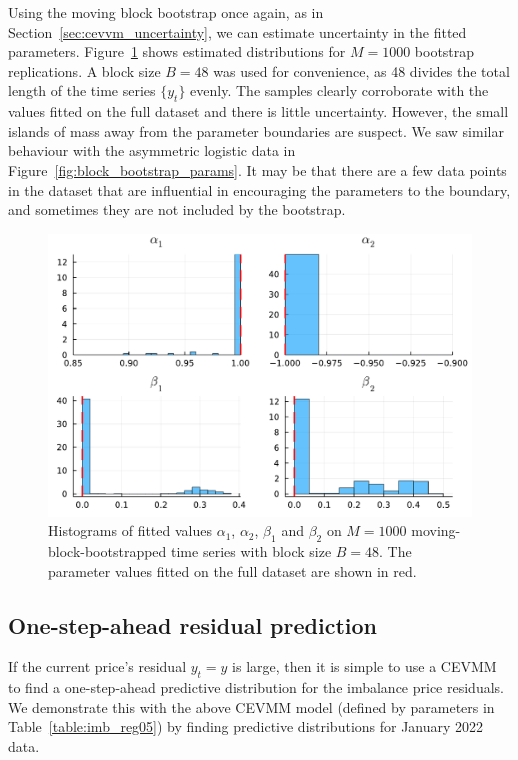 \documentclass[11pt,twoside,openany]{book}
\numberwithin{Theorem}{chapter}
\numberwithin{Definition}{chapter}
\numberwithin{Lemma}{chapter}
\numberwithin{Algorithm}{chapter}
\numberwithin{equation}{chapter}
\begin{document}
Using the moving block bootstrap once again, as in Section~\ref{sec:cevvm_uncertainty}, we can
estimate uncertainty in the fitted parameters. Figure~\ref{fig:parameter_uncert_k2}
shows estimated distributions for $M=1000$ bootstrap replications.
A block size $B=48$ was used for convenience, as 48 divides the total length of the
time series $\{y_t\}$ evenly.
The samples clearly corroborate with the values fitted on the full dataset and
there is little uncertainty. However,
the small islands of mass away from the parameter boundaries are suspect.
We saw similar behaviour with the asymmetric logistic data in
Figure~\ref{fig:block_bootstrap_params}. It may be that there are
a few data points in the dataset that are influential in encouraging
the parameters to the boundary, and sometimes they are not included by the bootstrap.


\begin{figure}[htp]
  \centering
  \includegraphics[scale=0.7]{../elexon/figures/parameter_uncert_k2.pdf}
  \caption{Histograms of fitted values $\alpha_1$, $\alpha_2$, $\beta_1$ and $\beta_2$ on $M=1000$ moving-block-bootstrapped time series with block size $B=48$. The parameter values fitted
on the full dataset are shown in red.}\label{fig:parameter_uncert_k2}
\end{figure}

\FloatBarrier
\subsection{One-step-ahead residual prediction}

If the current price's residual $y_t=y$ is large, then it is simple to use a CEVMM to find
a one-step-ahead predictive distribution for the imbalance price residuals.
We demonstrate this with the above CEVMM model (defined by parameters in Table~\ref{table:imb_reg05})
by finding predictive distributions for January 2022 data.
\end{document}
